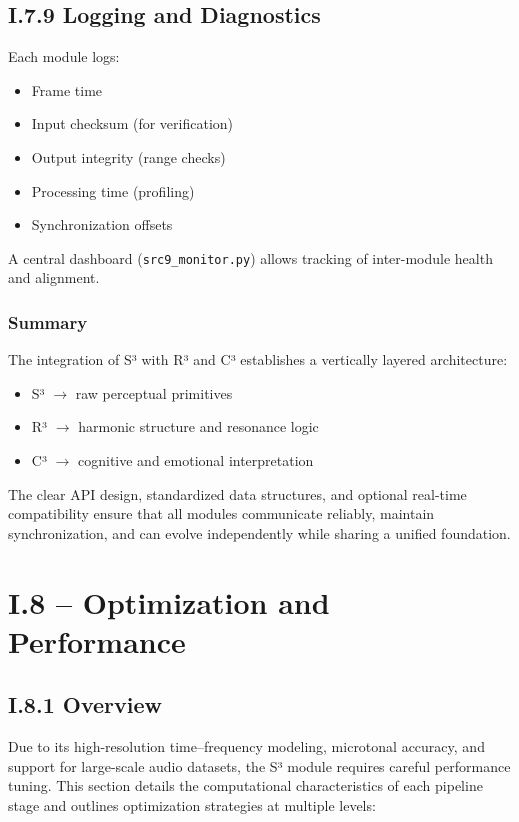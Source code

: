 \subsection*{I.7.9 Logging and Diagnostics}

Each module logs:

\begin{itemize}
    \item Frame time
    \item Input checksum (for verification)
    \item Output integrity (range checks)
    \item Processing time (profiling)
    \item Synchronization offsets
\end{itemize}

A central dashboard (\texttt{src9\_monitor.py}) allows tracking of inter-module health and alignment.

\subsubsection*{Summary}

The integration of S³ with R³ and C³ establishes a vertically layered architecture:

\begin{itemize}
    \item S³ $\rightarrow$ raw perceptual primitives
    \item R³ $\rightarrow$ harmonic structure and resonance logic
    \item C³ $\rightarrow$ cognitive and emotional interpretation
\end{itemize}

The clear API design, standardized data structures, and optional real-time compatibility ensure that all modules communicate reliably, maintain synchronization, and can evolve independently while sharing a unified foundation.

\section*{I.8 – Optimization and Performance}

\subsection*{I.8.1 Overview}

Due to its high-resolution time–frequency modeling, microtonal accuracy, and support for large-scale audio datasets, the S³ module requires careful performance tuning. This section details the computational characteristics of each pipeline stage and outlines optimization strategies at multiple levels:

